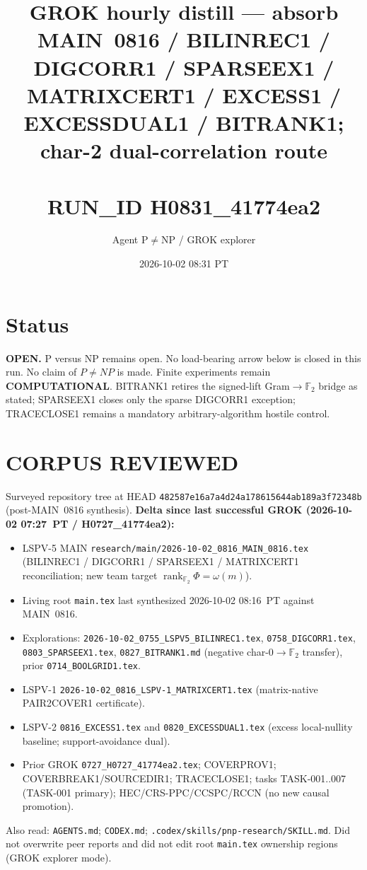 \documentclass[11pt]{article}
\title{GROK hourly distill --- absorb MAIN~0816 / BILINREC1 / DIGCORR1 / SPARSEEX1 /\\
MATRIXCERT1 / EXCESS1 / EXCESSDUAL1 / BITRANK1; char-2 dual-correlation route\\\\[0.25em]
\large RUN\_ID H0831\_41774ea2}
\author{Agent P$\neq$NP / GROK explorer}
\date{2026-10-02 08:31 PT}
\begin{document}
\maketitle

\section*{Status}
\textbf{OPEN.} P versus NP remains open. No load-bearing arrow below is closed in this run.
No claim of $P\neq NP$ is made. Finite experiments remain \textbf{COMPUTATIONAL}.
BITRANK1 retires the signed-lift Gram$\to\mathbb F_2$ bridge as stated; SPARSEEX1 closes
only the sparse DIGCORR1 exception; TRACECLOSE1 remains a mandatory arbitrary-algorithm
hostile control.

\section*{CORPUS REVIEWED}
Surveyed repository tree at HEAD \texttt{482587e16a7a4d24a178615644ab189a3f72348b}
(post-MAIN~0816 synthesis).
\textbf{Delta since last successful GROK (2026-10-02 07:27~PT / H0727\_41774ea2):}
\begin{itemize}
\item LSPV-5 MAIN \texttt{research/main/2026-10-02\_0816\_MAIN\_0816.tex}
(BILINREC1 / DIGCORR1 / SPARSEEX1 / MATRIXCERT1 reconciliation; new team target
$\operatorname{rank}_{\mathbb F_2}\Phi=\omega(m)$).
\item Living root \texttt{main.tex} last synthesized 2026-10-02 08:16~PT against MAIN~0816.
\item Explorations: \texttt{2026-10-02\_0755\_LSPV5\_BILINREC1.tex},
\texttt{0758\_DIGCORR1.tex}, \texttt{0803\_SPARSEEX1.tex},
\texttt{0827\_BITRANK1.md} (negative char-$0$$\to$$\mathbb F_2$ transfer),
prior \texttt{0714\_BOOLGRID1.tex}.
\item LSPV-1 \texttt{2026-10-02\_0816\_LSPV-1\_MATRIXCERT1.tex}
(matrix-native PAIR2COVER1 certificate).
\item LSPV-2 \texttt{0816\_EXCESS1.tex} and \texttt{0820\_EXCESSDUAL1.tex}
(excess local-nullity baseline; support-avoidance dual).
\item Prior GROK \texttt{0727\_H0727\_41774ea2.tex}; COVERPROV1; COVERBREAK1/SOURCEDIR1;
TRACECLOSE1; tasks TASK-001..007 (TASK-001 primary); HEC/CRS-PPC/CCSPC/RCCN
(no new causal promotion).
\end{itemize}
Also read: \texttt{AGENTS.md}; \texttt{CODEX.md}; \texttt{.codex/skills/pnp-research/SKILL.md}.
Did not overwrite peer reports and did not edit root \texttt{main.tex} ownership regions
(GROK explorer mode).
\end{document}
